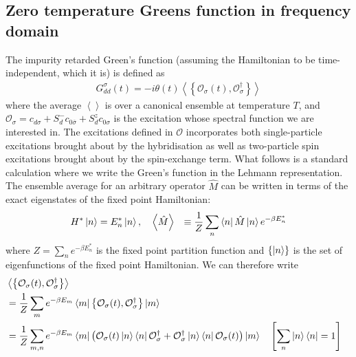 \documentclass{report}
\numberwithin{equation}{section}
\begin{document}
\begin{appendices}
\chapter{Zero temperature Greens function in frequency domain}

\label{appx-spectral-func}
The impurity retarded Green's function (assuming the Hamiltonian to be time-independent, which it is) is defined as
\begin{equation}\begin{aligned}
	G_{dd}^\sigma(t) = -i\theta(t) \left<\left\{ \mathcal{O}_{\sigma}(t),\mathcal{O}^\dagger_{\sigma} \right\}  \right>
\end{aligned}\end{equation}
where the average \(\left< \right>\) is over a canonical ensemble at temperature \(T\), and \(\mathcal{O}_\sigma = c_{d\sigma} + S_d^- c_{0\overline\sigma} + S_d^z c_{0\sigma}\) is the excitation whose spectral function we are interested in. The excitations defined in \(\mathcal{O}\) incorporates both single-particle excitations brought about by the hybridisation as well as two-particle spin excitations brought about by the spin-exchange term. What follows is a standard calculation where we write the Green's function in the Lehmann representation. The ensemble average for an arbitrary operator \(\hat M\) can be written in terms of the exact eigenstates of the fixed point Hamiltonian:
\begin{equation}\begin{aligned}
	H^* \ket{n} &= E_n^* \ket{n}, ~ ~ ~\left<\hat M \right> &\equiv \frac{1}{Z}\sum_n \bra{n} \hat M \ket{n} e^{-\beta E_n^*}
\end{aligned}\end{equation}
where \(Z = \sum_n e^{-\beta E_n^*}\) is the fixed point partition function and \(\left\{ \ket{n} \right\} \) is the set of eigenfunctions of the fixed point Hamiltonian. We can therefore write
\begin{equation}\begin{aligned}
	&\left<\left\{ \mathcal{O}_{\sigma}(t),\mathcal{O}^\dagger_{\sigma} \right\}  \right> \\
	&= \frac{1}{Z}\sum_{m}e^{-\beta E_m}\bra{m}\left\{ \mathcal{O}_{\sigma}(t),\mathcal{O}^\dagger_{\sigma} \right\} \ket{m}\\
	&= \frac{1}{Z}\sum_{m,n}e^{-\beta E_m}\bra{m}\left( \mathcal{O}_{\sigma}(t)\ket{n}\bra{n}\mathcal{O}^\dagger_{\sigma} + \mathcal{O}^\dagger_{\sigma}\ket{n}\bra{n}\mathcal{O}_{\sigma}(t)\right) \ket{m} && \left[\sum_n \ket{n}\bra{n} = 1\right]  \\

\end{aligned}
\end{equation}
\end{appendices}
\end{document}
